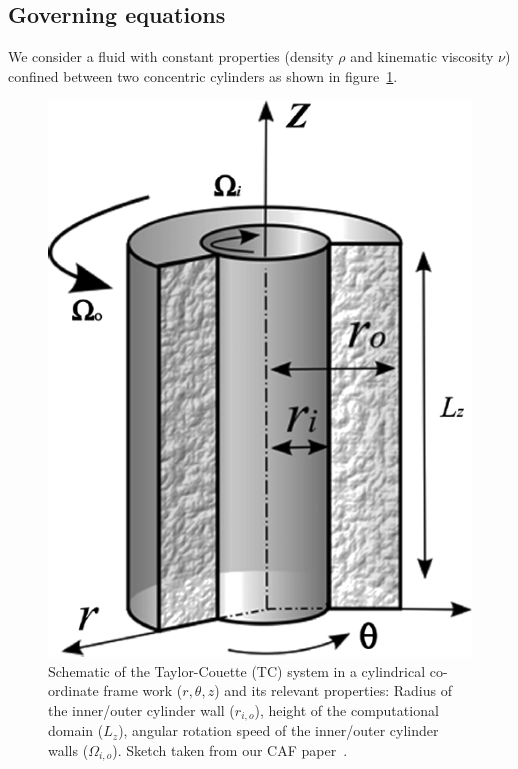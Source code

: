 \documentclass[a4paper, 11pt, DIV=11]{scrartcl}
\begin{document}
\subsection{Governing equations}
\label{sec:governingEquations}

We consider a fluid with constant properties (density $\rho$ and kinematic
viscosity $\nu$) confined between two concentric cylinders as shown in
figure~\ref{fig:tc}.
\begin{figure}
\includegraphics[width=1.00\linewidth]{figures/taylorCouette.png}
\caption{Schematic of the Taylor-Couette (TC) system in a cylindrical
co-ordinate frame work ($r, \theta, z$) and its relevant properties:
Radius of the inner/outer cylinder wall ($r_{i,o}$), height of the
computational domain ($L_z$), angular rotation speed of the inner/outer
cylinder walls ($\Omega_{i,o}$). Sketch taken from our CAF paper~\cite{Shi2015}.
}
\label{fig:tc}
\end{figure}
\end{document}
